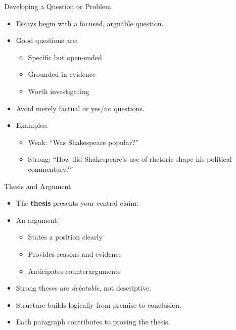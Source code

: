 \documentclass[aspectratio=169]{beamer}
\begin{document}
\begin{frame}{Developing a Question or Problem}
\begin{itemize}
  \item Essays begin with a focused, arguable question.
  \item Good questions are:
    \begin{itemize}
      \item Specific but open-ended
      \item Grounded in evidence
      \item Worth investigating
    \end{itemize}
  \item Avoid merely factual or yes/no questions.
  \item Examples:
    \begin{itemize}
      \item Weak: “Was Shakespeare popular?”
      \item Strong: “How did Shakespeare’s use of rhetoric shape his political commentary?”
    \end{itemize}
\end{itemize}
\end{frame}

\begin{frame}{Thesis and Argument}
\begin{itemize}
  \item The \textbf{thesis} presents your central claim.
  \item An argument:
    \begin{itemize}
      \item States a position clearly
      \item Provides reasons and evidence
      \item Anticipates counterarguments
    \end{itemize}
  \item Strong theses are \emph{debatable}, not descriptive.
  \item Structure builds logically from premise to conclusion.
  \item Each paragraph contributes to proving the thesis.
\end{itemize}
\end{frame}
\end{document}
